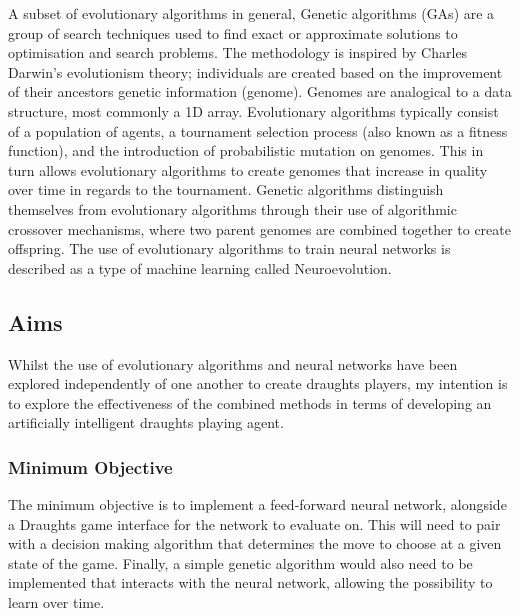 \documentclass[12pt,a4paper]{article}
\begin{document}
    A subset of evolutionary algorithms in general, Genetic algorithms (GAs) are a group of search techniques used to find exact or approximate solutions to optimisation and search problems. The methodology is inspired by Charles Darwin's evolutionism theory; individuals are created based on the improvement of their ancestors genetic information (genome). Genomes are analogical to a data structure, most commonly a 1D array. Evolutionary algorithms typically consist of a population of agents, a tournament selection process (also known as a fitness function), and the introduction of probabilistic mutation on genomes. This in turn allows evolutionary algorithms to create genomes that increase in quality over time in regards to the tournament. Genetic algorithms distinguish themselves from evolutionary algorithms through their use of algorithmic crossover mechanisms, where two parent genomes are combined together to create offspring. The use of evolutionary algorithms to train neural networks is described as a type of machine learning called Neuroevolution.

    \subsection{Aims}

    Whilst the use of evolutionary algorithms and neural networks have been explored independently of one another to create draughts players, my intention is to explore the effectiveness of the combined methods in terms of developing an artificially intelligent draughts playing agent. 

    \subsubsection{Minimum Objective}
        The minimum objective is to implement a feed-forward neural network, alongside a Draughts game interface for the network to evaluate on. This will need to pair with a decision making algorithm that determines the move to choose at a given state of the game. Finally, a simple genetic algorithm would also need to be implemented that interacts with the neural network, allowing the possibility to learn over time.
\end{document}
